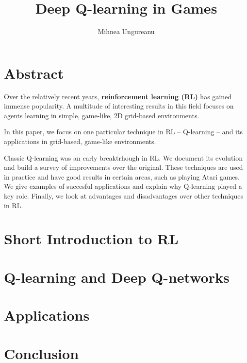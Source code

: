 \documentclass[12pt]{report}
\title{
    {Deep Q-learning in Games}
}
\author{Mihnea Ungureanu}
\begin{document}
\maketitle

\chapter*{Abstract}
Over the relatively recent years, \textbf{reinforcement learning (RL)} has gained immense popularity.
A multitude of interesting results in this field focuses on agents learning in simple, game-like, 2D grid-based environments.

In this paper, we focus on one particular technique in RL -- Q-learning -- and its applications in grid-based, game-like environments.

Classic Q-learning was an early breaktrhough in RL.
We document its evolution and build a survey of improvements over the original.
These techniques are used in practice and have good results in certain areas, such as playing Atari games.
We give examples of succesful applications and explain why Q-learning played a key role.
Finally, we look at advantages and disadvantages over other techniques in RL.

\tableofcontents

\chapter{Short Introduction to RL}


\chapter{Q-learning and Deep Q-networks}


\chapter{Applications}


\chapter{Conclusion}



\end{document}
